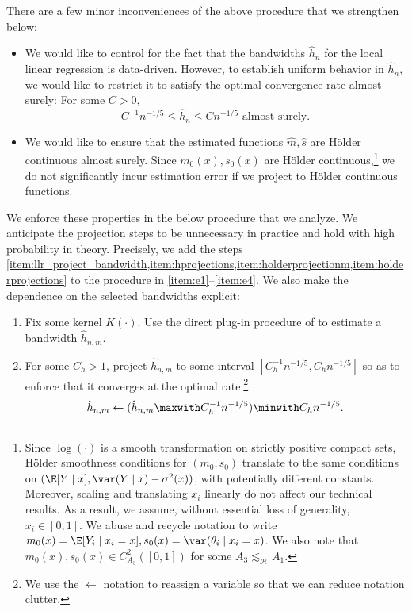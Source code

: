 \documentclass[12pt, reqno]{amsart}
\newcommand{\leH}{\lesssim_{\mathcal{H}}}
\newcommand{\hatm}{\hat m}
\newcommand{\hats}{\hat s}
\numberwithin{equation}{section}
\begin{document}
\begin{refsection}
\begin{appendices}
There are a few minor inconveniences of the
above
procedure that we
strengthen below:
\begin{itemize}
  \item We would like to control for the fact that the bandwidths $\hat h_n$ for the local
  linear
  regression is data-driven. However, to establish uniform behavior in $\hat h_n$, we
  would like to restrict it to satisfy the optimal convergence rate almost surely: 
  For some $C > 0$, \[
C^{-1} n^{-1/5} \le \hat h_n \le Cn^{-1/5} \text{ almost surely.}
  \]
  \item We would like to ensure that the estimated functions $\hatm, \hats$ are H\"older
   continuous almost surely. Since $m_0(x), s_0(x)$ are H\"older continuous,\footnote
   {Since $\log (\cdot)$ is a smooth transformation on strictly positive compact sets,
   H\"older smoothness conditions for $(m_0, s_0)$ translate to the same conditions on $
   (\E[Y\mid x], \var(Y\mid x) - \sigma^2(x))$, with potentially different constants.
   Moreover, scaling and translating $x_i$ linearly do not affect our technical results.
   As a result, we assume, without essential loss of generality, $x_i \in[0,1]$. We abuse
   and recycle notation to write $m_0(x) = \E[Y_i \mid x_i = x], s_0(x) =
\var(\theta_i \mid x_i = x)$. We also note that $m_0(x), s_0(x) \in C_{A_3}^2([0,1])$ for
some $A_3 \leH A_1$.} we do not
  significantly
  incur estimation error if
  we project to H\"older continuous functions. 
\end{itemize}

We enforce these properties in the below procedure that we analyze. We anticipate the
projection steps to be unnecessary in practice and hold with high probability in theory.
Precisely, we add the steps
\cref{item:llr_project_bandwidth,item:hprojections,item:holderprojectionm,item:holderprojections}
to the procedure in \cref{item:e1}--\cref{item:e4}. We also make the dependence on the
selected bandwidths explicit:

\begin{enumerate}[label=(LLR-\arabic*)]
  \item \label{item:llr1} Fix some kernel $K(\cdot)$. Use the direct plug-in procedure of
  \citet{calonico2019nprobust} to estimate a
  bandwidth $\hat h_{n,m}$.
  \item \label{item:llr_project_bandwidth} For some $C_h > 1$, project $\hat h_{n,m}$ to
  some interval $[C_h^{-1} n^{-1/5},
  C_h
  n^{-1/5}]$ so as to
  enforce that it converges at the optimal rate:\footnote{We use the $\gets$ notation to
  reassign a variable so that we can reduce notation clutter.} \[
\hat h_{n,m} \gets (\hat h_{n,m} \maxwith C_h^{-1} n^{-1/5}) \minwith C_h
  n^{-1/5}.
  \]


\end{enumerate}
\end{appendices}
\end{refsection}
\end{document}
